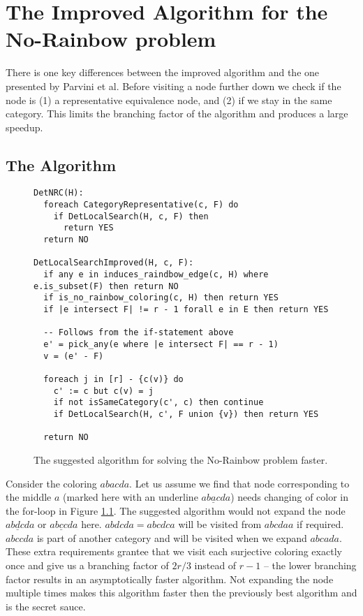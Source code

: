\documentclass{book}
\theoremstyle{definition}
\begin{document}
\chapter{The Improved Algorithm for the No-Rainbow problem}
There is one key differences between the improved algorithm and the one presented by Parvini et al. Before visiting a node further down we check if the node is (1) a representative equivalence node, and (2) if we stay in the same category. This limits the branching factor of the algorithm and produces a large speedup.


\section{The Algorithm}
\begin{figure}
\begin{verbatim}
DetNRC(H):
  foreach CategoryRepresentative(c, F) do
    if DetLocalSearch(H, c, F) then
      return YES
  return NO

DetLocalSearchImproved(H, c, F):
  if any e in induces_raindbow_edge(c, H) where e.is_subset(F) then return NO
  if is_no_rainbow_coloring(c, H) then return YES
  if |e intersect F| != r - 1 forall e in E then return YES

  -- Follows from the if-statement above
  e' = pick_any(e where |e intersect F| == r - 1)
  v = (e' - F)

  foreach j in [r] - {c(v)} do
    c' := c but c(v) = j
    if not isSameCategory(c', c) then continue
    if DetLocalSearch(H, c', F union {v}) then return YES

  return NO
\end{verbatim}
\label{alg:nrc++}
\caption{The suggested algorithm for solving the No-Rainbow problem faster.}

\end{figure}

Consider the coloring $abacda$. Let us assume we find that node corresponding to the middle $a$ (marked here with an underline $ab\underline{a}cda$) needs changing of color in the for-loop in Figure \ref{alg:nrc++}. The suggested algorithm would not expand the node $ab\underline{d}cda$ or $ab\underline{c}cda$ here. $abdcda = abcdca$ will be visited from $abcdaa$ if required. $abccda$ is part of another category and will be visited when we expand $abcada$. These extra requirements grantee that we visit each surjective coloring exactly once and give us a branching factor of $2r/3$ instead of $r-1$ -- the lower branching factor results in an asymptotically faster algorithm. Not expanding the node multiple times makes this algorithm faster then the previously best algorithm and is the secret sauce.
\end{document}
